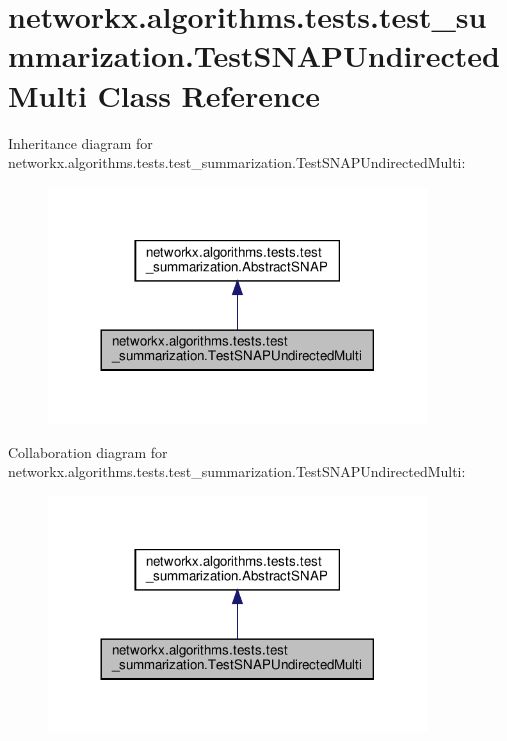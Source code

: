 \hypertarget{classnetworkx_1_1algorithms_1_1tests_1_1test__summarization_1_1TestSNAPUndirectedMulti}{}\section{networkx.\+algorithms.\+tests.\+test\+\_\+summarization.\+Test\+S\+N\+A\+P\+Undirected\+Multi Class Reference}
\label{classnetworkx_1_1algorithms_1_1tests_1_1test__summarization_1_1TestSNAPUndirectedMulti}


Inheritance diagram for networkx.\+algorithms.\+tests.\+test\+\_\+summarization.\+Test\+S\+N\+A\+P\+Undirected\+Multi\+:
\nopagebreak
\begin{figure}[H]
\begin{center}
\leavevmode
\includegraphics[width=284pt]{classnetworkx_1_1algorithms_1_1tests_1_1test__summarization_1_1TestSNAPUndirectedMulti__inherit__graph}
\end{center}
\end{figure}


Collaboration diagram for networkx.\+algorithms.\+tests.\+test\+\_\+summarization.\+Test\+S\+N\+A\+P\+Undirected\+Multi\+:
\nopagebreak
\begin{figure}[H]
\begin{center}
\leavevmode
\includegraphics[width=284pt]{classnetworkx_1_1algorithms_1_1tests_1_1test__summarization_1_1TestSNAPUndirectedMulti__coll__graph}
\end{center}
\end{figure}
